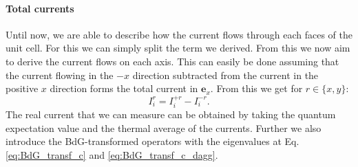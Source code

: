 \documentclass[../main.tex]{subfile}
\begin{document}
\paragraph{Total currents}
Until now, we are able to describe how the current flows through each faces of the unit cell. For this we can simply split the term we derived.
From this we now aim to derive the current flows on each axis.
This can easily be done assuming that the current flowing in the $-x$ direction subtracted from the current in the positive $x$ direction forms the total current in $\bm{e}_x$.
From this we get for $r\in\{x,y\}$:
\[
    I_{i}^{r} = I_{i}^{+r} - I_{i}^{-r}.
\]
The real current that we can measure can be obtained by taking the quantum expectation value and the thermal average of the currents. Further we also introduce the 
BdG-transformed operators with the eigenvalues at Eq. \ref{eq:BdG_transf_c} and \ref{eq:BdG_transf_c_dagg}. \\
\end{document}
